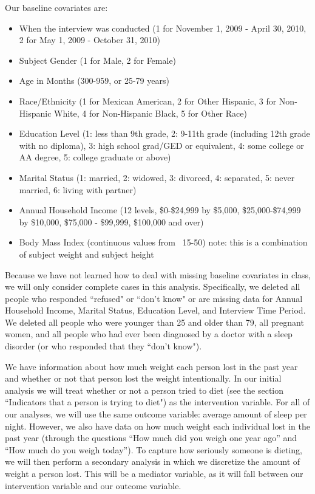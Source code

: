 \documentclass{article}
\begin{document}
Our baseline covariates are:
\begin{itemize}
\item When the interview was conducted (1 for November 1, 2009 - April 30, 2010, 2 for May 1, 2009 - October 31, 2010)
\item Subject Gender (1 for Male, 2 for Female)
\item Age in Months (300-959, or 25-79 years)
\item Race/Ethnicity (1 for Mexican American, 2 for Other Hispanic, 3 for Non-Hispanic White, 4 for Non-Hispanic Black, 5 for Other Race)
\item Education Level (1: less than 9th grade, 2: 9-11th grade (including 12th grade with no diploma), 3: high school grad/GED or equivalent, 4: some college or AA degree, 5: college graduate or above)
\item Marital Status (1: married, 2: widowed, 3: divorced, 4: separated, 5: never married, 6: living with partner)
\item Annual Household Income (12 levels, \$0-\$24,999 by \$5,000, \$25,000-\$74,999 by \$10,000,  \$75,000 - \$99,999, \$100,000 and over)
\item Body Mass Index (continuous values from ~15-50) note: this is a combination of subject weight and subject height
\end{itemize}

Because we have not learned how to deal with missing baseline covariates in class, we will only consider complete cases in this analysis.  Specifically, we deleted all people who responded ``refused" or ``don't know" or are missing data for Annual Household Income, Marital Status, Education Level, and Interview Time Period.  We deleted all people who were younger than 25 and older than 79, all pregnant women, and all people who had ever been diagnosed by a doctor with a sleep disorder (or who responded that they ``don't know").  

We have information about how much weight each person lost in the past year and whether or not that person lost the weight intentionally.  In our initial analysis we will treat whether or not a person tried to diet (see the section ``Indicators that a person is trying to diet") as the intervention variable. For all of our analyses, we will use the same outcome variable: average amount of sleep per night. However, we also have data on how much weight each individual lost in the past year (through the questions ``How much did you weigh one year ago'' and   ``How much do you weigh today'').  To capture how seriously someone is dieting, we will then perform a secondary analysis in which we discretize the amount of weight a person lost.  This will be a mediator variable, as it will fall between our intervention variable and our outcome variable.
\end{document}
